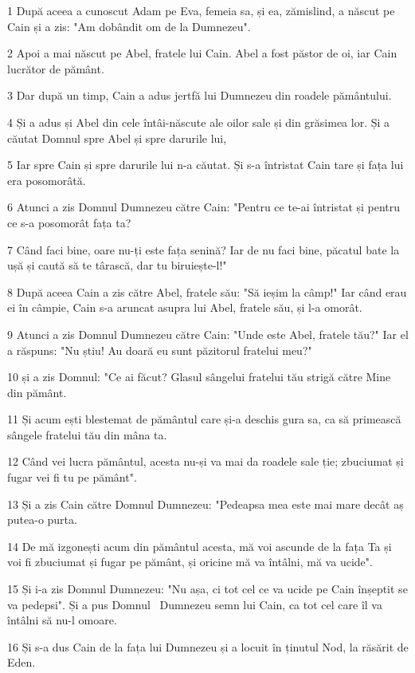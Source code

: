 \par 1 După aceea a cunoscut Adam pe Eva, femeia sa, și ea, zămislind, a născut pe Cain și a zis: "Am dobândit om de la Dumnezeu".
\par 2 Apoi a mai născut pe Abel, fratele lui Cain. Abel a fost păstor de oi, iar Cain lucrător de pământ.
\par 3 Dar după un timp, Cain a adus jertfă lui Dumnezeu din roadele pământului.
\par 4 Și a adus și Abel din cele întâi-născute ale oilor sale și din grăsimea lor. Și a căutat Domnul spre Abel și spre darurile lui,
\par 5 Iar spre Cain și spre darurile lui n-a căutat. Și s-a întristat Cain tare și fața lui era posomorâtă.
\par 6 Atunci a zis Domnul Dumnezeu către Cain: "Pentru ce te-ai întristat și pentru ce s-a posomorât fața ta?
\par 7 Când faci bine, oare nu-ți este fața senină? Iar de nu faci bine, păcatul bate la ușă și caută să te târască, dar tu biruiește-l!"
\par 8 După aceea Cain a zis către Abel, fratele său: "Să ieșim la câmp!" Iar când erau ei în câmpie, Cain s-a aruncat asupra lui Abel, fratele său, și l-a omorât.
\par 9 Atunci a zis Domnul Dumnezeu către Cain: "Unde este Abel, fratele tău?" Iar el a răspuns: "Nu știu! Au doară eu sunt păzitorul fratelui meu?"
\par 10 și a zis Domnul: "Ce ai făcut? Glasul sângelui fratelui tău strigă către Mine din pământ.
\par 11 Și acum ești blestemat de pământul care și-a deschis gura sa, ca să primească sângele fratelui tău din mâna ta.
\par 12 Când vei lucra pământul, acesta nu-și va mai da roadele sale ție; zbuciumat și fugar vei fi tu pe pământ".
\par 13 Și a zis Cain către Domnul Dumnezeu: "Pedeapsa mea este mai mare decât aș putea-o purta.
\par 14 De mă izgonești acum din pământul acesta, mă voi ascunde de la fața Ta și voi fi zbuciumat și fugar pe pământ, și oricine mă va întâlni, mă va ucide".
\par 15 Și i-a zis Domnul Dumnezeu: "Nu așa, ci tot cel ce va ucide pe Cain înșeptit se va pedepsi". Și a pus Domnul  Dumnezeu semn lui Cain, ca tot cel care îl va întâlni să nu-l omoare.
\par 16 Și s-a dus Cain de la fața lui Dumnezeu și a locuit în ținutul Nod, la răsărit de Eden.
